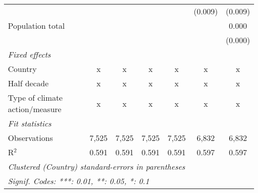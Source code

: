 \begin{tabular}{lcccccc}
                                                    &         &         &         &         & (0.009) & (0.009)\\   
   Population total                                 &         &         &         &         &         & 0.000\\   
                                                    &         &         &         &         &         & (0.000)\\   
   \emph{Fixed effects}\\
   Country                                          & x       & x       & x       & x       & x       & x\\  
   Half decade                                      & x       & x       & x       & x       & x       & x\\  
   Type of climate action/measure                   & x       & x       & x       & x       & x       & x\\  
   \midrule \emph{Fit statistics}\\
   Observations                                     & 7,525   & 7,525   & 7,525   & 7,525   & 6,832   & 6,832\\  
   R$^2$                                            & 0.591   & 0.591   & 0.591   & 0.591   & 0.597   & 0.597\\  
   \midrule
   \multicolumn{7}{l}{\emph{Clustered (Country) standard-errors in parentheses}}\\
   \multicolumn{7}{l}{\emph{Signif. Codes: ***: 0.01, **: 0.05, *: 0.1}}\\
\end{tabular}
\par\endgroup


